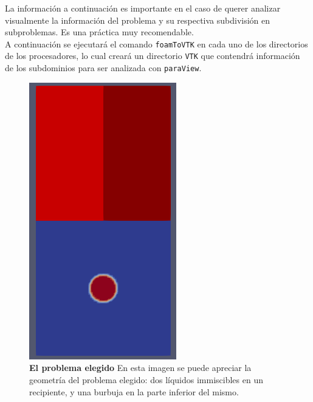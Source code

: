 \documentclass{article}
\begin{document}
La información a continuación es importante en el caso de querer analizar visualmente la información del problema y su respectiva subdivisión en subproblemas. Es una práctica muy recomendable.\\
A continuación se ejecutará el comando \texttt{foamToVTK} en cada uno de los directorios de los procesadores, lo cual creará un directorio \texttt{VTK} que contendrá información de los subdominios para ser analizada con \texttt{paraView}.

\begin{figure}[H]
    \centering
    \includegraphics[scale=0.5]{../res/imgs/image8.png}
    \caption{\textbf{El problema elegido} En esta imagen se puede apreciar la geometría del problema elegido: dos líquidos immiscibles en un recipiente, y una burbuja en la parte inferior del mismo.}
\end{figure}
\end{document}
